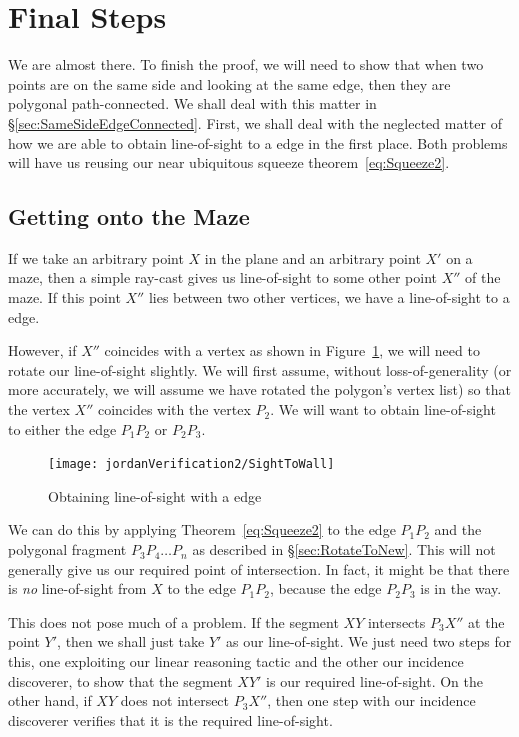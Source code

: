 \section{Final Steps}
We are almost there. To finish the proof, we will need to show that when two points are on the same side and looking at the same edge, then they are polygonal path-connected. We shall deal with this matter in \S\ref{sec:SameSideEdgeConnected}. First, we shall deal with the neglected matter of how we are able to obtain line-of-sight to a edge in the first place. Both problems will have us reusing our near ubiquitous squeeze theorem~\eqref{eq:Squeeze2}.

\subsection{Getting onto the Maze}
If we take an arbitrary point $X$ in the plane and an arbitrary point $X'$ on a maze, then a simple ray-cast gives us line-of-sight to some other point $X''$ of the maze. If this point $X''$ lies between two other vertices, we have a line-of-sight to a edge. 

However, if $X''$ coincides with a vertex as shown in Figure~\ref{fig:SightToEdge}, we will need to rotate our line-of-sight slightly. We will first assume, without loss-of-generality (or more accurately, we will assume we have rotated the polygon's vertex list) so that the vertex $X''$ coincides with the vertex $P_2$. We will want to obtain line-of-sight to either the edge $P_1P_2$ or $P_2P_3$.

\begin{figure}
  \centering\texttt{[image: jordanVerification2/SightToWall]}
  \caption{Obtaining line-of-sight with a edge}
  \label{fig:SightToEdge}
\end{figure}

We can do this by applying Theorem~\ref{eq:Squeeze2} to the edge $P_1P_2$ and the polygonal fragment $P_3P_4\ldots P_n$ as described in \S\ref{sec:RotateToNew}. This will not generally give us our required point of intersection. In fact, it might be that there is \emph{no} line-of-sight from $X$ to the edge $P_1P_2$, because the edge $P_2P_3$ is in the way. 

This does not pose much of a problem. If the segment $XY$ intersects $P_3X''$ at the point $Y'$, then we shall just take $Y'$ as our line-of-sight. We just need two steps for this, one exploiting our linear reasoning tactic and the other our incidence discoverer, to show that the segment $XY'$ is our required line-of-sight. On the other hand, if $XY$ does not intersect $P_3X''$, then one step with our incidence discoverer verifies that it is the required line-of-sight. 

